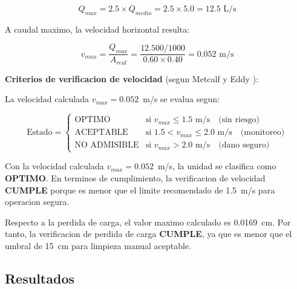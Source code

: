 \begin{equation}
Q_{{max}} = 2.5 \times Q_{{medio}} = 2.5 \times 5.0 = 12.5 \text{ L/s}
\end{equation}

A caudal maximo, la velocidad horizontal resulta:

\begin{equation}
v_{{max}} = \frac{Q_{{max}}}{A_{{real}}} = \frac{12.500/1000}{0.60 \times 0.40} = 0.052 \text{ m/s}
\end{equation}

\textbf{Criterios de verificacion de velocidad} (segun Metcalf y Eddy \cite{metcalf2014}):

La velocidad calculada $v_{{max}} = 0.052$~m/s se evalua segun:

\begin{equation}
\text{Estado} = \begin{cases}
    \text{OPTIMO} & \text{si } v_{{max}} \leq 1.5 \text{ m/s} \quad \text{(sin riesgo)} \\
    \text{ACEPTABLE} & \text{si } 1.5 < v_{{max}} \leq 2.0 \text{ m/s} \quad \text{(monitoreo)} \\
    \text{NO ADMISIBLE} & \text{si } v_{{max}} > 2.0 \text{ m/s} \quad \text{(dano seguro)}
\end{cases}
\end{equation}

Con la velocidad calculada $v_{{max}} = 0.052$~m/s, la unidad se clasifica como \textbf{OPTIMO}. En terminos de cumplimiento, la verificacion de velocidad \textbf{CUMPLE} porque es menor que el limite recomendado de 1.5~m/s para operacion segura.

Respecto a la perdida de carga, el valor maximo calculado es 0.0169~cm. Por tanto, la verificacion de perdida de carga \textbf{CUMPLE}, ya que es menor que el umbral de 15~cm para limpieza manual aceptable.

\subsection{Resultados}

